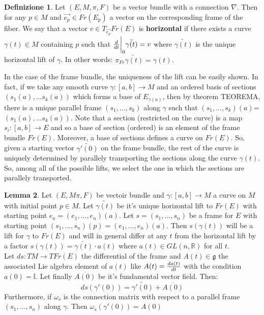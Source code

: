 \documentclass[12pt,a4paper]{report}
\theoremstyle{definition}
\newtheorem{Def}{Definizione}[chapter]
\theoremstyle{Theorem}
\newtheorem{Lm}[Def]{Lemma}
\theoremstyle{definition}
\theoremstyle{definition}
\theoremstyle{definition}
\begin{document}
			\begin{Def}
				Let $(E,M,\pi,F)$ be a vector bundle with a connection $\nabla$. Then for any $p\in M$ and $\vec{e_p}\in Fr(E_p)$ a vector on the corresponding frame of the fiber. We say that a vector $v\in T_{\vec{e_p}}Fr(E)$ is \textbf{horizontal} if there exists a curve $\gamma(t)\in M$ containing $p$ such that ${d\over dt}\bigg|_0\tilde{\gamma(t)}=v$ where $\tilde{\gamma(t)}$ is the unique horizontal lift of $\gamma$. In other words: $\pi_{Fr}\tilde{\gamma(t)}=\gamma(t)$.
			\end{Def}
			In the case of the frame bundle, the uniqueness of the lift can be easily shown. In fact, if we take any smooth curve $\gamma:[a,b]\rightarrow M$ and an ordered basis of sections $(s_1(a),...s_k(a))$ which forms a base of $E_{\gamma(a)}$, then by theorem TEOREMA, there is a unique parallel frame $(s_1,...,s_k)$ along $\gamma$ such that $(s_1,...,s_k)(a)$= $(s_1(a),...s_k(a))$. Note that a section (restricted on the curve) is a map $s_i:[a,b]\rightarrow E$ and so a base of section (ordered) is an element of the frame bundle $Fr(E)$. Moreover, a base of sections defines a curve on $Fr(E)$. So, given a starting vector $\tilde{\gamma'(0)}$ on the frame bundle, the rest of the curve is uniquely determined by parallely transporting the sections along the curve $\gamma(t)$. So, among all of the possible lifts, we select the one in which the sections are parallely transported.
			\begin{Lm}
				Let $(E,M\pi,F)$ be vectoir bundle and $\gamma:[a,b]\rightarrow M$ a curve on $M$ with initial point $p\in M$. Let $\tilde{\gamma(t)}$ be it's unique horizontal lift to $Fr(E)$ with starting point $e_a=(e_1,...,e_n)(a)$. Let $s=(s_1,...,s_n)$ be a frame for $E$ with starting point $(s_1,...,s_n)(p)=(e_1,...,e_n)(a)$. Then $s(\gamma(t))$ will be a lift for $\gamma$ to $Fr(E)$ and will in general differ at any $t$ from the horizontal lift by a factor $s(\gamma(t))=\tilde{\gamma(t)}\cdot a(t)$ where $a(t)\in GL(n,\mathbb{R})$ for all $t$.\\
				Let $ds:TM\rightarrow TFr(E)$ the differential of the frame and $A(t)\in\mathfrak{g}$ the associated Lie algebra element of $a(t)$ like $A(t)={da(t)\over dt}$ with the condition $a(0)=\mathbb{I}$. Let finally $\overline{A(0)}$ be it's fundamental vector field. Then:
				$$ds(\gamma'(0))=\tilde{\gamma'(0)}+\overline{A(0)}$$
				Furthermore, if $\omega_s$ is the connection matrix with respect to a parallel frame $(s_1,...,s_n)$ along $\gamma$. Then $\omega_s(\gamma'(0))=A(0)$
			\end{Lm} 
\end{document}
